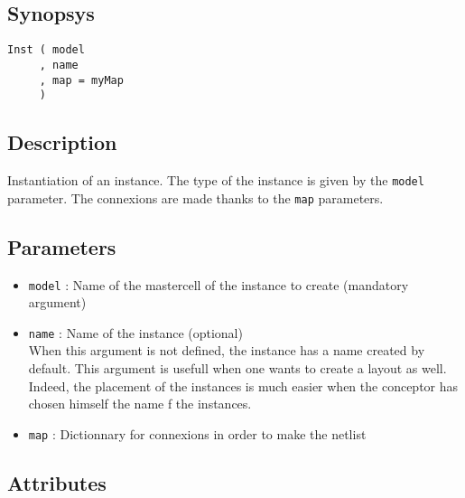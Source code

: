 \subsection{Synopsys}

\begin{verbatim}
Inst ( model
     , name
     , map = myMap
     )
\end{verbatim}

\subsection{Description}

Instantiation of an instance. The type of the instance is given by the \verb-model- parameter. The connexions are made thanks to the \verb-map- parameters.

\subsection{Parameters}

\begin{itemize}
    \item \verb-model- : Name of the mastercell of the instance to create (mandatory argument)
    \item \verb-name- : Name of the instance (optional)\\
When this argument is not defined, the instance has a name created by default. This argument is usefull when one wants to create a layout as well. Indeed, the placement of the instances is much easier when the conceptor has chosen himself the name f the instances.
    \item \verb-map- : Dictionnary for connexions in order to make the netlist\\
\end{itemize}

\subsection{Attributes}

